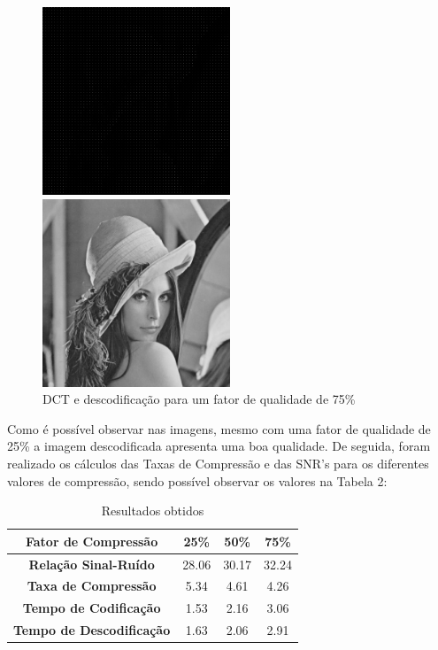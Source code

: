 \documentclass[12pt,a4paper]{article}
\begin{document}
\begin{figure}[h]
	\centering
    \begin{minipage}{0.50\textwidth}
        \centering
        \includegraphics[width=0.5\textwidth]{imagens/ex7/DCT75.png}
    \end{minipage}\hfill
    \begin{minipage}{0.50\textwidth}
        \centering
        \includegraphics[width=0.5\textwidth]{imagens/ex7/IDCT75.png}
    \end{minipage}
    \caption{DCT e descodificação para um fator de qualidade de 75\%}
\end{figure}

Como é possível observar nas imagens, mesmo com uma fator de qualidade de 25\% a imagem descodificada apresenta uma boa qualidade. De seguida, foram realizado os cálculos das Taxas de Compressão e das SNR's para os diferentes valores de compressão, sendo possível observar os valores na Tabela 2:
\newpage
\begin{table}[]
\centering
\begin{tabular}{|c|c|c|c|}
\hline
\textbf{Fator de Compressão}     & \textbf{25\%} & \textbf{50\%} & \textbf{75\%} \\ \hline
\textbf{Relação Sinal-Ruído}     & 28.06         & 30.17         & 32.24         \\ \hline
\textbf{Taxa de Compressão}      & 5.34          & 4.61          & 4.26          \\ \hline
\textbf{Tempo de Codificação}    & 1.53          & 2.16          & 3.06          \\ \hline
\textbf{Tempo de Descodificação} & 1.63          & 2.06          & 2.91          \\ \hline
\end{tabular}
\caption{Resultados obtidos}
\label{my-label}
\end{table}
\end{document}
